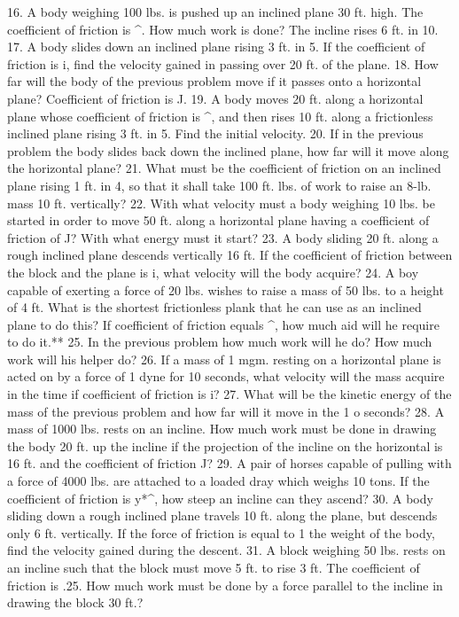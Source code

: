 16. A body weighing 100 lbs. is pushed up an inclined plane 30 ft. high. The coefficient of friction is ^. How much work is done? The incline rises 6 ft. in 10.
17. A body slides down an inclined plane rising 3 ft. in 5. If the coefficient of friction is i, find the velocity gained in passing over 20 ft. of the plane.
18. How far will the body of the previous problem move if it passes onto a horizontal plane? Coefficient of friction is J.
19. A body moves 20 ft. along a horizontal plane whose coefficient of friction is ^, and then rises 10 ft. along a frictionless inclined plane rising 3 ft. in 5. Find the initial velocity.
20. If in the previous problem the body slides back down the inclined plane, how far will it move along the horizontal plane?
21. What must be the coefficient of friction on an inclined plane rising 1 ft. in 4, so that it shall take 100 ft. lbs. of work to raise an 8-lb. mass 10 ft. vertically?
22. With what velocity must a body weighing 10 lbs. be started in order to move 50 ft. along a horizontal plane having a coefficient of friction of J? With what energy must it start?
23. A body sliding 20 ft. along a rough inclined plane descends vertically 16 ft. If the coefficient of friction between the block and the plane is i, what velocity will the body acquire?
24. A boy capable of exerting a force of 20 lbs. wishes to raise a mass of 50 lbs. to a height of 4 ft. What is the shortest frictionless plank that he can use as an inclined plane to do this? If coefficient of friction equals ^, how much aid will he require to do it.**
25. In the previous problem how much work will he do? How much work will his helper do?
26. If a mass of 1 mgm. resting on a horizontal plane is acted on by a force of 1 dyne for 10 seconds, what velocity will the mass acquire in the time if coefficient of friction is i?
27. What will be the kinetic energy of the mass of the previous problem and how far will it move in the 1 o seconds?
28. A mass of 1000 lbs. rests on an incline. How much work must be done in drawing the body 20 ft. up the incline if the projection of the incline on the horizontal is 16 ft. and the coefficient of friction J?
29. A pair of horses capable of pulling with a force of 4000 lbs. are attached to a loaded dray which weighs 10 tons. If the coefficient of friction is y*^, how steep an incline can they ascend?
30. A body sliding down a rough inclined plane travels 10 ft. along the plane, but descends only 6 ft. vertically. If the force of friction is equal to 1 the weight of the body, find the velocity gained during the descent.
31. A block weighing 50 lbs. rests on an incline such that the block must move 5 ft. to rise 3 ft. The coefficient of friction is .25. How much work must be done by a force parallel to the incline in drawing the block 30 ft.?
